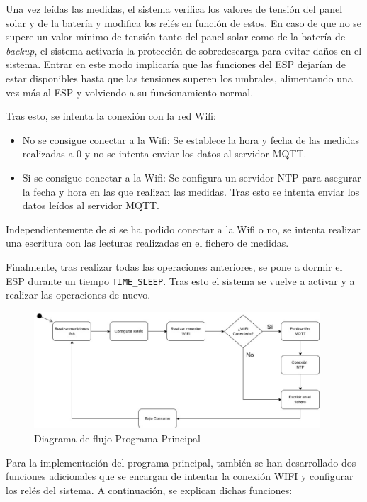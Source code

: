 Una vez leídas las medidas, el sistema verifica los valores de tensión del panel solar y de la batería y modifica los relés en función de estos.
En caso de que no se supere un valor mínimo de tensión tanto del panel solar como de la batería de \textit{backup}, el sistema activaría la protección de sobredescarga para evitar daños en el sistema. 
Entrar en este modo implicaría que las funciones del ESP dejarían de estar disponibles hasta que las tensiones superen los umbrales, alimentando una vez más al ESP y volviendo a su funcionamiento normal.

Tras esto, se intenta la conexión con la red Wifi:
\begin{itemize}
    \item No se consigue conectar a la Wifi: Se establece la hora y fecha de las medidas realizadas a 0 y no se intenta enviar los datos al servidor MQTT. 
    \item Si se consigue conectar a la Wifi: Se configura un servidor NTP para asegurar la fecha y hora en las que realizan las medidas. Tras esto se intenta enviar los datos leídos al servidor MQTT.
\end{itemize}

Independientemente de si se ha podido conectar a la Wifi o no, se intenta realizar una escritura con las lecturas realizadas en el fichero de medidas.

Finalmente, tras realizar todas las operaciones anteriores, se pone a dormir el ESP durante un tiempo \texttt{TIME\_SLEEP}. Tras esto el sistema se vuelve a activar y a realizar las operaciones de nuevo.

\begin{figure}[H]
    \centering
    \includegraphics[width=0.95\textwidth]{images/3-software/3-3-programaprincipal/DiagramaDeFlujoPOWER.jpg}
    \caption{Diagrama de flujo Programa Principal}
    \label{fig:3-3-1-DiagramaFlujo}
\end{figure}

Para la implementación del programa principal, también se han desarrollado dos funciones adicionales que se encargan de intentar la conexión WIFI y configurar los relés del sistema. A continuación, se explican dichas funciones:

